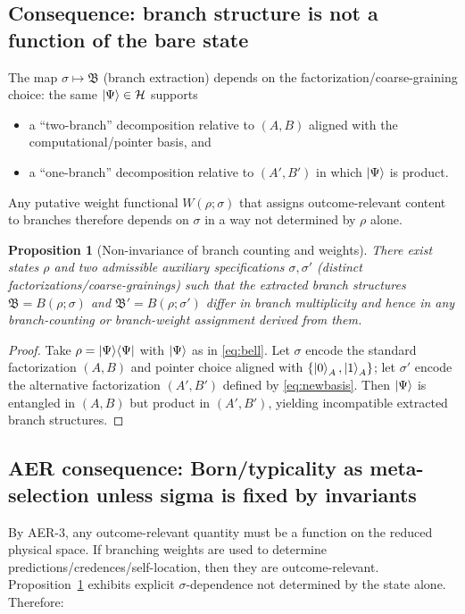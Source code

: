 \documentclass[11pt]{article}
\newtheorem{proposition}[definition]{Proposition}
\theoremstyle{remark}
\theoremstyle{plain}
\begin{document}
\subsection{Consequence: branch structure is not a function of the bare state}

The map $\sigma\mapsto \mathfrak{B}$ (branch extraction) depends on the factorization/coarse-graining choice:
the same $\ket{\Psi}\in\mathcal{H}$ supports
\begin{itemize}
\item a ``two-branch'' decomposition relative to $(A,B)$ aligned with the computational/pointer basis, and
\item a ``one-branch'' decomposition relative to $(A',B')$ in which $\ket{\Psi}$ is product.
\end{itemize}
Any putative weight functional $W(\rho;\sigma)$ that assigns outcome-relevant content to branches
therefore depends on $\sigma$ in a way not determined by $\rho$ alone.

\begin{proposition}[Non-invariance of branch counting and weights]
\label{prop:noninvariance}
There exist states $\rho$ and two admissible auxiliary specifications $\sigma,\sigma'$ (distinct factorizations/coarse-grainings)
such that the extracted branch structures $\mathfrak{B}=B(\rho;\sigma)$ and $\mathfrak{B}'=B(\rho;\sigma')$
differ in branch multiplicity and hence in any branch-counting or branch-weight assignment derived from them.
\end{proposition}

\begin{proof}
Take $\rho=\ket{\Psi}\!\bra{\Psi}$ with $\ket{\Psi}$ as in \eqref{eq:bell}.
Let $\sigma$ encode the standard factorization $(A,B)$ and pointer choice aligned with $\{\ket{0}_A,\ket{1}_A\}$;
let $\sigma'$ encode the alternative factorization $(A',B')$ defined by \eqref{eq:newbasis}.
Then $\ket{\Psi}$ is entangled in $(A,B)$ but product in $(A',B')$, yielding incompatible extracted branch structures.
\end{proof}

\subsection{AER consequence: Born/typicality as meta-selection unless sigma is fixed by invariants}

By AER-3, any outcome-relevant quantity must be a function on the reduced physical space.
If branching weights are used to determine predictions/credences/self-location, then they are outcome-relevant.
Proposition~\ref{prop:noninvariance} exhibits explicit $\sigma$-dependence not determined by the state alone.
Therefore:
\end{document}

